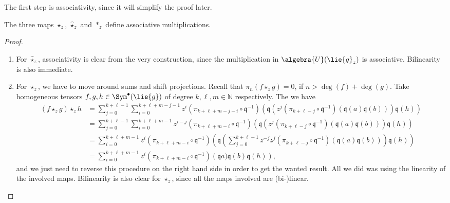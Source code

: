 The first step is associativity, since it will simplify the proof later.
\begin{proposition}
	\label{Alg:Lemma:Associtivity}
	The three maps $\star_z$, $\widehat{\star}_z$ and $\ast_z$ define
	associative multiplications.
\end{proposition}
\begin{proof}
  \mbox{}
  \begin{enumerate}
	\item 
	For $\widehat{\star}_z$, associativity is clear from the very 
	construction, since the multiplication in $\algebra{U}(\lie{g}_z)$
	is associative. Bilinearity is also immediate.
	
	\item
	For $\star_z$, we have to move around sums and shift projections.
	Recall that $\pi_n(f \star_z g) = 0$, if $n > \deg(f) + \deg(g)$.
	Take homogeneous tensors $f, g, h \in \Sym^{\bullet}(\lie{g})$
	of degree $k, \ell, m \in \mathbb{N}$ respectively. The we have
	\begin{align*}
		\left(
			f \star_z g
		\right)
		\star_z
		h
		& =
		\sum\limits_{j=0}^{k + \ell -1}
		\sum\limits_{i = 0}^{k + \ell + m -j - 1}
		z^i
		\left( 
			\pi_{k + \ell + m - j - i} 
			\circ 
			\mathfrak{q}^{-1}
		\right)
		\left(
			\mathfrak{q}
			\left(
				z^j
				\left(
					\pi_{k + \ell - j} 
					\circ 
					\mathfrak{q}^{-1}
				\right)
				\left(
					\mathfrak{q} (a)
					\mathfrak{q} (b)
				\right)
			\right)
			\mathfrak{q}(h)
		\right)
		\\
		& =
		\sum\limits_{j=0}^{k + \ell -1}
		\sum\limits_{i = 0}^{k + \ell + m - 1}
		z^{i-j}
		\left( 
			\pi_{k + \ell + m - i} 
			\circ 
			\mathfrak{q}^{-1}
		\right)
		\left(
			\mathfrak{q}
			\left(
				z^j
				\left(
					\pi_{k + \ell - j} 
					\circ 
					\mathfrak{q}^{-1}
				\right)
				\left(
					\mathfrak{q} (a)
					\mathfrak{q} (b)
				\right)
			\right)
			\mathfrak{q}(h)
		\right)
		\\
		& =
		\sum\limits_{i = 0}^{k + \ell + m - 1}
		z^i
		\left( 
			\pi_{k + \ell + m - i} 
			\circ 
			\mathfrak{q}^{-1}
		\right)
		\left(
			\mathfrak{q}
			\left(
				\sum\limits_{j=0}^{k + \ell -1}
				z^{-j}
				z^j
				\left(
					\pi_{k + \ell - j} 
					\circ 
					\mathfrak{q}^{-1}
				\right)
				\left(
					\mathfrak{q} (a)
					\mathfrak{q} (b)
				\right)
			\right)
			\mathfrak{q}(h)
		\right)
		\\
		& =
		\sum\limits_{i = 0}^{k + \ell + m - 1}
		z^i
		\left( 
			\pi_{k + \ell + m - i} 
			\circ 
			\mathfrak{q}^{-1}
		\right)
		\left(
			\mathfrak{q} a)
			\mathfrak{q}(b)
			\mathfrak{q}(h)
		\right),
	\end{align*}
	and we just need to reverse this procedure on the right hand side
	in order to get the wanted result. All we did was using the linearity 
	of the involved maps. Bilinearity is also clear for $\star_z$, since
	all the maps involved are (bi-)linear.
		

\end{enumerate}
\end{proof}
